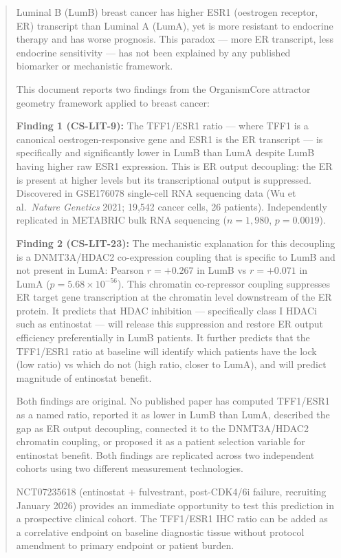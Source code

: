 \documentclass[12pt, a4paper]{article}
\begin{document}
\begin{abstract}
\noindent
Luminal B (LumB) breast cancer has higher ESR1
(oestrogen receptor, ER) transcript than Luminal A
(LumA), yet is more resistant to endocrine therapy
and has worse prognosis. This paradox --- more ER
transcript, less endocrine sensitivity ---
has not been explained by any published biomarker
or mechanistic framework.

\medskip
\noindent
This document reports two findings from the
OrganismCore attractor geometry framework applied
to breast cancer:

\medskip
\noindent
\textbf{Finding 1 (CS-LIT-9):} The TFF1/ESR1 ratio
--- where TFF1 is a canonical oestrogen-responsive
gene and ESR1 is the ER transcript --- is specifically
and significantly lower in LumB than LumA despite
LumB having higher raw ESR1 expression. This is ER
output decoupling: the ER is present at higher levels
but its transcriptional output is suppressed. Discovered
in GSE176078 single-cell RNA sequencing data (Wu et al.\
\textit{Nature Genetics} 2021; 19,542 cancer cells,
26 patients). Independently replicated in METABRIC
bulk RNA sequencing ($n=1{,}980$, $p=0.0019$).

\medskip
\noindent
\textbf{Finding 2 (CS-LIT-23):} The mechanistic
explanation for this decoupling is a DNMT3A/HDAC2
co-expression coupling that is specific to LumB and
not present in LumA: Pearson $r=+0.267$ in LumB vs
$r=+0.071$ in LumA ($p=5.68\times10^{-56}$). This
chromatin co-repressor coupling suppresses ER target
gene transcription at the chromatin level downstream
of the ER protein. It predicts that HDAC inhibition
--- specifically class I HDACi such as entinostat ---
will release this suppression and restore ER output
efficiency preferentially in LumB patients. It
further predicts that the TFF1/ESR1 ratio at baseline
will identify which patients have the lock (low ratio)
vs which do not (high ratio, closer to LumA), and
will predict magnitude of entinostat benefit.

\medskip
\noindent
Both findings are original. No published paper has
computed TFF1/ESR1 as a named ratio, reported it as
lower in LumB than LumA, described the gap as ER
output decoupling, connected it to the DNMT3A/HDAC2
chromatin coupling, or proposed it as a patient
selection variable for entinostat benefit. Both
findings are replicated across two independent cohorts
using two different measurement technologies.

\medskip
\noindent
NCT07235618 (entinostat $+$ fulvestrant, post-CDK4/6i
failure, recruiting January 2026) provides an immediate
opportunity to test this prediction in a prospective
clinical cohort. The TFF1/ESR1 IHC ratio can be added
as a correlative endpoint on baseline diagnostic tissue
without protocol amendment to primary endpoint or
patient burden.
\end{abstract}
\end{document}
